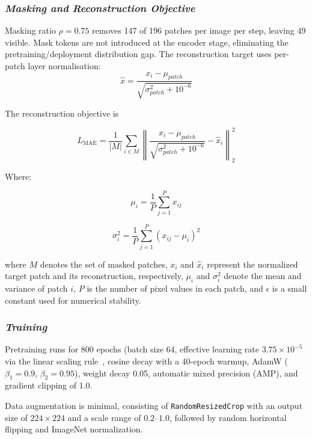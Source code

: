 \documentclass[conference]{IEEEtran}
\begin{document}
\subsubsection{\textit{\textbf{Masking and Reconstruction Objective}}}
Masking ratio $\rho = 0.75$ removes 147 of 196 patches per image per step, leaving 49 visible. Mask tokens are not introduced at the encoder stage, eliminating the pretraining/deployment distribution gap. The reconstruction target uses per-patch layer normalisation:
\begin{equation}
\hat{x}
=
\frac{x_i-\mu_{patch}}
{\sqrt{\sigma^2_{patch}+10^{-6}}}
\end{equation}


The reconstruction objective is

\begin{equation}
L_{\mathrm{MAE}}
=
\frac{1}{|M|}
\sum_{i \in M}
\left\|
\frac{x_i-\mu_{patch}}
{\sqrt{\sigma^2_{patch}+10^{-6}}}
-
\hat{x}_i
\right\|_2^2
\end{equation}

Where:

\begin{equation}
\mu_i=\frac{1}{P}\sum_{j=1}^{P}x_{ij}
\end{equation}

\begin{equation}
\sigma_i^2=\frac{1}{P}\sum_{j=1}^{P}(x_{ij}-\mu_i)^2
\end{equation}

where $M$ denotes the set of masked patches, $x_i$ and
$\hat{x}_i$ represent the normalized target patch and its
reconstruction, respectively, $\mu_i$ and $\sigma_i^2$
denote the mean and variance of patch $i$, $P$ is the
number of pixel values in each patch, and $\epsilon$
is a small constant used for numerical stability.

\subsubsection{\textit{\textbf{Training}}}

Pretraining runs for 800 epochs (batch size 64, effective learning rate
$3.75 \times 10^{-5}$ via the linear scaling rule~\cite{5},
cosine decay with a 40-epoch warmup, AdamW
($\beta_1 = 0.9$, $\beta_2 = 0.95$),
weight decay 0.05, automatic mixed precision (AMP),
and gradient clipping of 1.0.

Data augmentation is minimal, consisting of
\texttt{RandomResizedCrop} with an output size of
$224 \times 224$ and a scale range of $0.2$--$1.0$,
followed by random horizontal flipping and
ImageNet normalization.
\end{document}

